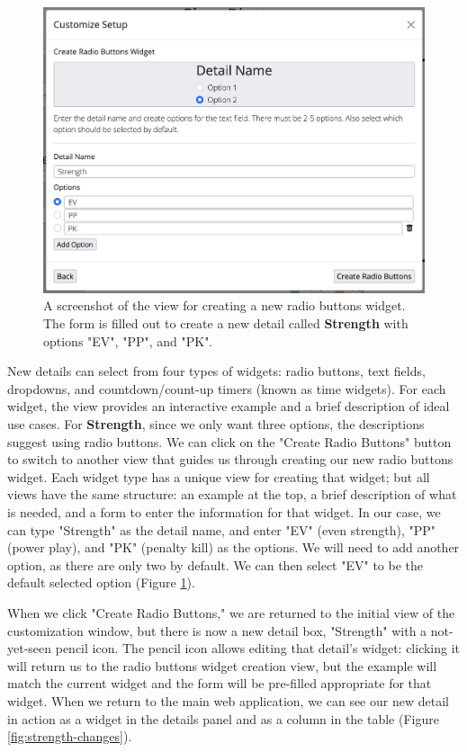 \documentclass[letterpaper]{article}
\begin{document}
\begin{figure}[h]
		\centering
	\captionsetup{width=.8\linewidth}
	\includegraphics[width=.8\linewidth]{images/radio-buttons}
	\caption{A screenshot of the view for creating a new radio buttons widget. The form is filled out to create a new detail called \textbf{Strength} with options "EV", "PP", and "PK".}
	\label{fig:radio-buttons}
\end{figure}
New details can select from four types of widgets: radio buttons, text fields, dropdowns, and countdown/count-up timers (known as time widgets). For each widget, the view provides an interactive example and a brief description of ideal use cases. For \textbf{Strength}, since we only want three options, the descriptions suggest using radio buttons. We can click on the "Create Radio Buttons" button to switch to another view that guides us through creating our new radio buttons widget. Each widget type has a unique view for creating that widget; but all views have the same structure: an example at the top, a brief description of what is needed, and a form to enter the information for that widget. In our case, we can type "Strength" as the detail name,  and enter "EV" (even strength), "PP" (power play), and "PK" (penalty kill) as the options. We will need to add another option, as there are only two by default. We can then select "EV" to be the default selected option (Figure \ref{fig:radio-buttons}).

When we click "Create Radio Buttons," we are returned to the initial view of the customization window, but there is now a new detail box, "Strength" with a not-yet-seen pencil icon. The pencil icon allows editing that detail's widget: clicking it will return us to the radio buttons widget creation view, but the example will match the current widget and the form will be pre-filled appropriate for that widget. When we return to the main web application, we can see our new detail in action as a widget in the details panel and as a column in the table (Figure \ref{fig:strength-changes}).
\end{document}
